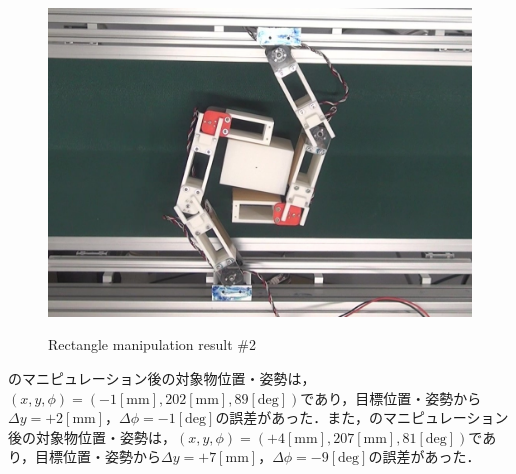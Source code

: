 \documentclass[a4paper,twoside,12pt,papersize, dvipdfmx]{iirthesis}
\begin{document}
\begin{figure}[b]
\begin{minipage}{0.249\hsize}
\subcaption{}\label{}
\end{minipage}\hfill
\begin{minipage}{0.249\hsize}
\centering
\includegraphics[width=0.98\hsize]{fig/4-manipulation-result/Rectangle/2-4.jpg}
\subcaption{}\label{}
\end{minipage}
\caption{Rectangle manipulation result \#2}\label{fig::result::rm2}
\end{figure}

のマニピュレーション後の対象物位置・姿勢は，$(x, y, \phi) = (-1 \mathrm{[mm]}, 202 \mathrm{[mm]}, 89 \mathrm{[deg]})$であり，目標位置・姿勢から$\Delta y = +2 \mathrm{[mm]}$，$\Delta \phi = -1 \mathrm{[deg]}$の誤差があった．また，のマニピュレーション後の対象物位置・姿勢は，$(x, y, \phi) = (+4 \mathrm{[mm]}, 207 \mathrm{[mm]}, 81 \mathrm{[deg]})$であり，目標位置・姿勢から$\Delta y = +7 \mathrm{[mm]}$，$\Delta \phi = -9 \mathrm{[deg]}$の誤差があった．\par
\end{document}
